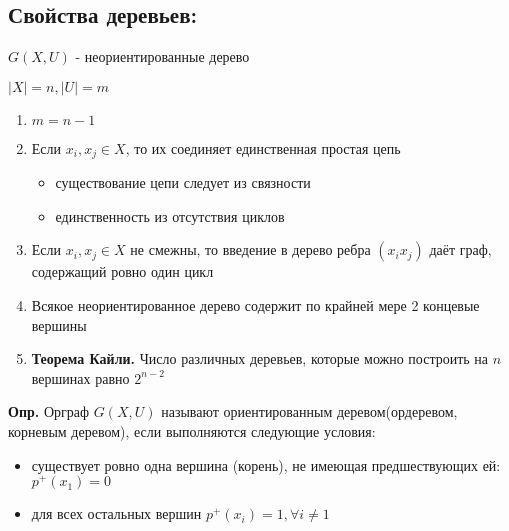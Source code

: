 \documentclass[10pt]{article}
\begin{document}
\subsection*{Свойства деревьев:}
\par $G(X, U)$ - неориентированные дерево
\par $|X| = n, |U| = m$
\begin{enumerate}
    \item $m = n - 1$
    \item Если $x_{i}, x_{j} \in X$, то их соединяет единственная простая цепь
        \begin{itemize}
            \item существование цепи следует из связности
            \item единственность из отсутствия циклов
        \end{itemize}
    \item Если $x_{i}, x_{j} \in X$ не смежны, то введение в дерево ребра $(x_{i} x_{j})$ даёт граф, содержащий ровно один цикл
    \item Всякое неориентированное дерево содержит по крайней мере 2 концевые вершины
    \item \textbf{Теорема Кайли.} Число различных деревьев, которые можно построить на $n$ вершинах равно $2^{n-2}$
\end{enumerate}

\par\textbf{Опр.} Орграф $G(X, U)$ называют ориентированным деревом(ордеревом, корневым деревом), если выполняются следующие условия:
\begin{itemize}
    \item существует ровно одна вершина (корень), не имеющая предшествующих ей: $p^+(x_{1}) = 0$
    \item для всех остальных вершин $p^+(x_{i}) = 1, \forall i \neq 1$
\end{itemize}
\end{document}
